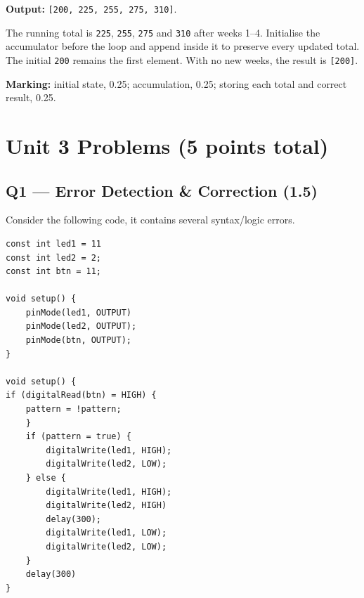 \documentclass[10pt]{article}
\let\OldSection\section
\renewcommand{\section}{\clearpage\OldSection}
\begin{document}
\textbf{Output:} \texttt{{[}200,\ 225,\ 255,\ 275,\ 310{]}}.

The running total is \texttt{225}, \texttt{255}, \texttt{275} and
\texttt{310} after weeks 1--4. Initialise the accumulator before the
loop and append inside it to preserve every updated total. The initial
\texttt{200} remains the first element. With no new weeks, the result is
\texttt{{[}200{]}}.

\textbf{Marking:} initial state, 0.25; accumulation, 0.25; storing each
total and correct result, 0.25.
\section*{Unit 3 Problems (5 points total)}

\subsection*{Q1 — Error Detection \& Correction (1.5)}
Consider the following code, it contains several syntax/logic errors.
\begin{verbatim}
const int led1 = 11
const int led2 = 2;
const int btn = 11;

void setup() {
    pinMode(led1, OUTPUT)
    pinMode(led2, OUTPUT);
    pinMode(btn, OUTPUT);
}

void setup() {
if (digitalRead(btn) = HIGH) {
    pattern = !pattern;
    }
    if (pattern = true) {
        digitalWrite(led1, HIGH);
        digitalWrite(led2, LOW);
    } else {
        digitalWrite(led1, HIGH);
        digitalWrite(led2, HIGH)
        delay(300);
        digitalWrite(led1, LOW);
        digitalWrite(led2, LOW);
    }
    delay(300)
}
\end{verbatim}
\end{document}

